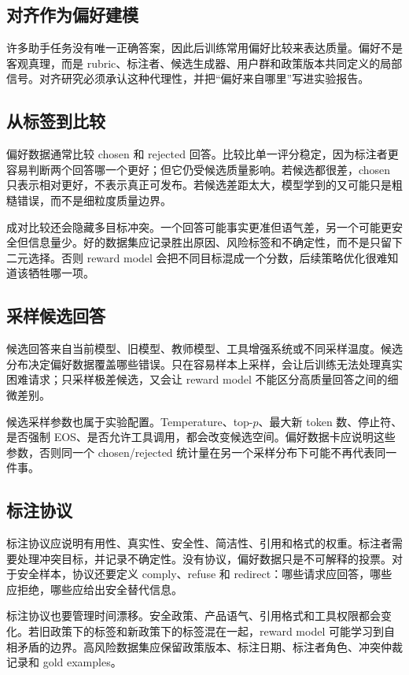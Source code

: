 \documentclass[UTF8,zihao=-4,openany]{ctexbook}
\begin{document}
\subsection{对齐作为偏好建模}
许多助手任务没有唯一正确答案，因此后训练常用偏好比较来表达质量。偏好不是客观真理，而是 rubric、标注者、候选生成器、用户群和政策版本共同定义的局部信号。对齐研究必须承认这种代理性，并把“偏好来自哪里”写进实验报告。

\subsection{从标签到比较}
偏好数据通常比较 chosen 和 rejected 回答。比较比单一评分稳定，因为标注者更容易判断两个回答哪一个更好；但它仍受候选质量影响。若候选都很差，chosen 只表示相对更好，不表示真正可发布。若候选差距太大，模型学到的又可能只是粗糙错误，而不是细粒度质量边界。

成对比较还会隐藏多目标冲突。一个回答可能事实更准但语气差，另一个可能更安全但信息量少。好的数据集应记录胜出原因、风险标签和不确定性，而不是只留下二元选择。否则 reward model 会把不同目标混成一个分数，后续策略优化很难知道该牺牲哪一项。

\subsection{采样候选回答}
候选回答来自当前模型、旧模型、教师模型、工具增强系统或不同采样温度。候选分布决定偏好数据覆盖哪些错误。只在容易样本上采样，会让后训练无法处理真实困难请求；只采样极差候选，又会让 reward model 不能区分高质量回答之间的细微差别。

候选采样参数也属于实验配置。Temperature、top-$p$、最大新 token 数、停止符、是否强制 EOS、是否允许工具调用，都会改变候选空间。偏好数据卡应说明这些参数，否则同一个 chosen/rejected 统计量在另一个采样分布下可能不再代表同一件事。

\subsection{标注协议}
标注协议应说明有用性、真实性、安全性、简洁性、引用和格式的权重。标注者需要处理冲突目标，并记录不确定性。没有协议，偏好数据只是不可解释的投票。对于安全样本，协议还要定义 comply、refuse 和 redirect：哪些请求应回答，哪些应拒绝，哪些应给出安全替代信息。

标注协议也要管理时间漂移。安全政策、产品语气、引用格式和工具权限都会变化。若旧政策下的标签和新政策下的标签混在一起，reward model 可能学习到自相矛盾的边界。高风险数据集应保留政策版本、标注日期、标注者角色、冲突仲裁记录和 gold examples。
\end{document}
